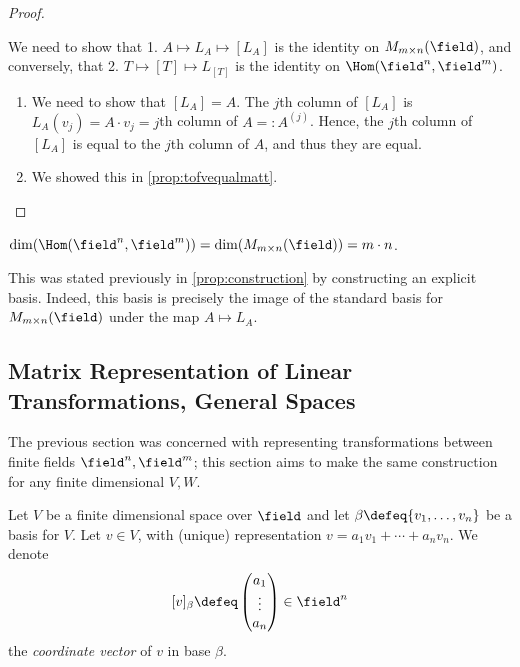 \begin{proof}
\begin{enumerate}
    \end{enumerate}
     We need to show that 1. $A \mapsto L_A \mapsto [L_A]$ is the identity on $M_{m \times n}(\field)$, and conversely, that 2. $T \mapsto [T] \mapsto L_{[T]}$ is the identity on $\Hom(\field^n, \field^m)$.
    \begin{enumerate}
        \item We need to show that $[L_A] = A$. The $j$th column of $[L_A]$ is $L_A(v_j) = A \cdot v_j = j$th column of $A =: A^{(j)}$. Hence, the $j$th column of $[L_A]$ is equal to the $j$th column of $A$, and thus they are equal.
        \item We showed this in \cref{prop:tofvequalmatt}.
    \end{enumerate}
\end{proof}

\begin{corollary}
    $\dim(\Hom(\field^n, \field^m)) = \dim(M_{m\times n}(\field)) = m \cdot n$.
\end{corollary}
\begin{remark}
    This was stated previously in \cref{prop:construction} by constructing an explicit basis. Indeed, this basis is precisely the image of the standard basis for $M_{m \times n}(\field)$ under the map $A \mapsto L_A$.
\end{remark}

\subsection{Matrix Representation of Linear Transformations, General Spaces}

\begin{remark}
    The previous section was concerned with representing transformations between finite fields $\field^n, \field^m$; this section aims to make the same construction for any finite dimensional $V, W$.
\end{remark}

\begin{definition}
    Let $V$ be a finite dimensional space over $\field$ and let $\beta \defeq \{v_1, \dots, v_n\}$ be a basis for $V$. Let $v \in V$, with (unique) representation $v = a_1 v_1 + \cdots + a_n v_n$. We denote \[
    [v]_\beta \defeq \begin{pmatrix}
        a_1\\
        \vdots\\
        a_n
    \end{pmatrix}     \in \field^n
    \]
    the \emph{coordinate vector} of $v$ in base $\beta$.
\end{definition}

